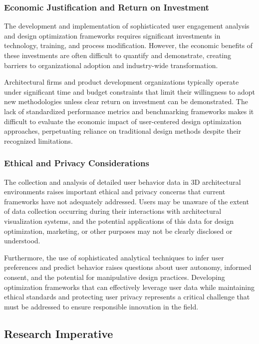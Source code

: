 \documentclass[12pt,a4paper]{book}
\begin{document}
\subsubsection{Economic Justification and Return on Investment}
\label{subsubsec:economic_justification}

The development and implementation of sophisticated user engagement analysis and design optimization frameworks requires significant investments in technology, training, and process modification. However, the economic benefits of these investments are often difficult to quantify and demonstrate, creating barriers to organizational adoption and industry-wide transformation.

Architectural firms and product development organizations typically operate under significant time and budget constraints that limit their willingness to adopt new methodologies unless clear return on investment can be demonstrated. The lack of standardized performance metrics and benchmarking frameworks makes it difficult to evaluate the economic impact of user-centered design optimization approaches, perpetuating reliance on traditional design methods despite their recognized limitations.

\subsubsection{Ethical and Privacy Considerations}
\label{subsubsec:ethical_considerations}

The collection and analysis of detailed user behavior data in 3D architectural environments raises important ethical and privacy concerns that current frameworks have not adequately addressed. Users may be unaware of the extent of data collection occurring during their interactions with architectural visualization systems, and the potential applications of this data for design optimization, marketing, or other purposes may not be clearly disclosed or understood.

Furthermore, the use of sophisticated analytical techniques to infer user preferences and predict behavior raises questions about user autonomy, informed consent, and the potential for manipulative design practices. Developing optimization frameworks that can effectively leverage user data while maintaining ethical standards and protecting user privacy represents a critical challenge that must be addressed to ensure responsible innovation in the field.

\subsection{Research Imperative}
\label{subsec:research_imperative}
\end{document}
